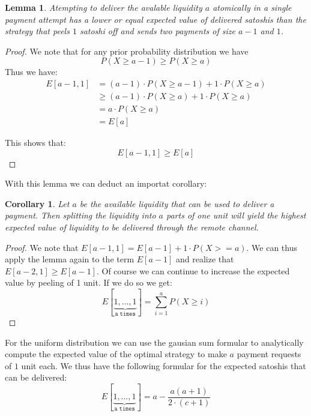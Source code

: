 \documentclass[10pt,twocolumn]{article}
\newtheorem{corollary}{Corollary}[theorem]
\newtheorem{lemma}[theorem]{Lemma}
\begin{document}
\begin{lemma}
\label{lemma}
Atempting to deliver the avalable liquidity $a$ atomically in a single payment attempt has a lower or equal expected value of delivered satoshis than the strategy that peels $1$ satoshi off and sends two payments of size $a-1$ and $1$.
\end{lemma}
\begin{proof}
We note that for any prior probability distribution we have
\[
P(X\geq a-1) \geq P(X\geq a)
\]
Thus we have:
\begin{equation}
\begin{split}
E[a-1,1] & = (a-1)\cdot P(X\geq a-1) + 1 \cdot P(X\geq a) \\
 & \geq (a-1)\cdot P(X\geq a) + 1 \cdot P(X\geq a) \\
 & = a \cdot P(X\geq a) \\
 & = E[a]
\end{split}
\end{equation}

This shows that:
\[
E[a-1,1] \geq E[a]
\]

\end{proof}

With this lemma we can deduct an importat corollary:

\begin{corollary}
\label{corollary}
Let $a$ be the available liquidity that can be used to deliver a payment. Then splitting the liquidity into $a$ parts of one unit will yield the highest expected value of liquidity to be delivered through the remote channel.
\end{corollary}

\begin{proof}
We note that $E[a-1,1] = E[a-1] + 1\cdot P(X>=a)$. We can thus apply the lemma again to the term $E[a-1]$ and realize that $E[a-2,1] \geq E[a-1]$. Of course we can continue to increase the expected value by peeling of 1 unit. If we do so we get:
\[
E[\underbrace{1,\dots,1}_{\texttt{a times}}] = \sum_{i=1}^a P(X\geq i)
\]
\end{proof}

For the uniform distribution we can use the gausian sum formular to analytically compute the expected value of the optimal strategy to make $a$ payment requests of $1$ unit each.
We thus have the following formular for the expected satoshis that can be delivered:
\begin{equation}
\label{eq:expvalue}
E[\underbrace{1,\dots,1}_{\texttt{a times}}] = a - \frac{a(a+1)}{2\cdot(c+1)}
\end{equation}
\end{document}
